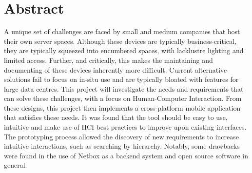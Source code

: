 \documentclass [11pt,a4paper]{article}
\begin{document}
\pagebreak

\section*{Abstract}
    \noindent
    A unique set of challenges are faced by small and medium companies that host their own server spaces. Although these devices are typically business-critical, they are typically squeezed into encumbered spaces, with lacklustre lighting and limited access. Further, and critically, this makes the maintaining and documenting of these devices inherently more difficult. Current alternative solutions fail to focus on in-situ use and are typically bloated with features for large data centres. This project will investigate the needs and requirements that can solve these challenges, with a focus on Human-Computer Interaction. From these designs, this project then implements a cross-platform mobile application that satisfies these needs. It was found that the tool should be easy to use, intuitive and make use of HCI best practices to improve upon existing interfaces. The prototyping process allowed the discovery of new requirements to increase intuitive interactions, such as searching by hierarchy. Notably, some drawbacks were found in the use of Netbox as a backend system and open source software in general.  
\end{document}
